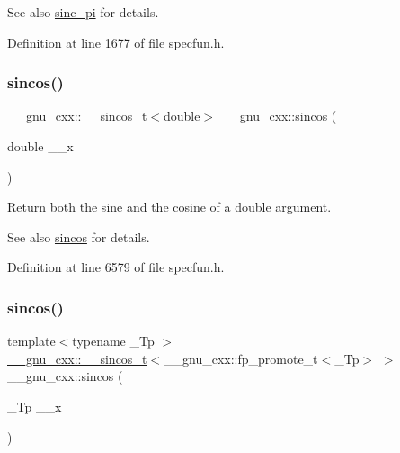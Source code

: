 \begin{DoxySeeAlso}{See also}
\hyperlink{group__gnu__math__spec__func_ga5195270024403b985e7d4f2f935f8779}{sinc\+\_\+pi} for details. 
\end{DoxySeeAlso}


Definition at line 1677 of file specfun.\+h.

\mbox{\label{group__gnu__math__spec__func_ga8041c24b528475bcf8a4178e484652a3}} 
\subsubsection{\texorpdfstring{sincos()}{sincos()}\hspace{0.1cm}{\footnotesize\ttfamily [1/2]}}
{\footnotesize\ttfamily \hyperlink{struct____gnu__cxx_1_1____sincos__t}{\+\_\+\+\_\+gnu\+\_\+cxx\+::\+\_\+\+\_\+sincos\+\_\+t}$<$double$>$ \+\_\+\+\_\+gnu\+\_\+cxx\+::sincos (\begin{DoxyParamCaption}\item[{double}]{\+\_\+\+\_\+x }\end{DoxyParamCaption})\hspace{0.3cm}{\ttfamily [inline]}}

Return both the sine and the cosine of a {\ttfamily double} argument.

\begin{DoxySeeAlso}{See also}
\hyperlink{group__gnu__math__spec__func_ga8041c24b528475bcf8a4178e484652a3}{sincos} for details. 
\end{DoxySeeAlso}


Definition at line 6579 of file specfun.\+h.

\mbox{\label{group__gnu__math__spec__func_ga5d3a375ada451e0a9a78441ddfcf52a3}} 
\subsubsection{\texorpdfstring{sincos()}{sincos()}\hspace{0.1cm}{\footnotesize\ttfamily [2/2]}}
{\footnotesize\ttfamily template$<$typename \+\_\+\+Tp $>$ \\
\hyperlink{struct____gnu__cxx_1_1____sincos__t}{\+\_\+\+\_\+gnu\+\_\+cxx\+::\+\_\+\+\_\+sincos\+\_\+t}$<$\+\_\+\+\_\+gnu\+\_\+cxx\+::fp\+\_\+promote\+\_\+t$<$\+\_\+\+Tp$>$ $>$ \+\_\+\+\_\+gnu\+\_\+cxx\+::sincos (\begin{DoxyParamCaption}\item[{\+\_\+\+Tp}]{\+\_\+\+\_\+x }\end{DoxyParamCaption})\hspace{0.3cm}{\ttfamily [inline]}}

